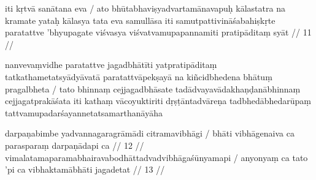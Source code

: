 iti kṛtvā sanātana eva  / ato bhūtabhaviṣyadvartamānavapuḥ kālastatra na kramate yataḥ kālasya tata eva samullāsa iti samutpattivināśabahiṣkṛte paratattve 'bhyupagate viśvasya viśvatvamupapannamiti pratipāditaṃ syāt  // 11  //

nanvevaṃvidhe paratattve jagadbhātīti yatpratipāditaṃ tatkathametatsyādyāvatā paratattvāpekṣayā na kiñcidbhedena bhātuṃ pragalbheta  / tato bhinnaṃ cejjagadbhāsate tadādvayavādakhaṇḍanābhinnaṃ cejjagatprakāśata iti kathaṃ vācoyuktiriti dṛṣṭāntadvāreṇa tadbhedābhedarūpaṃ tattvamupadarśayannetatsamarthanāyāha

darpaṇabimbe yadvannagaragrāmādi citramavibhāgi  /
bhāti vibhāgenaiva ca parasparaṃ darpaṇādapi ca  // 12  //
vimalatamaparamabhairavabodhāttadvadvibhāgaśūnyamapi  /
anyonyaṃ ca tato 'pi ca vibhaktamābhāti jagadetat  // 13  //

